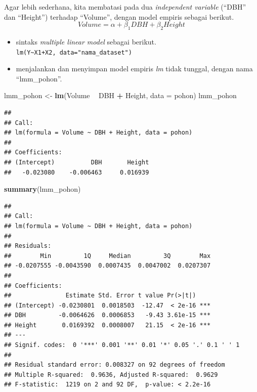 \documentclass[
  12pt,
  a4paper,
]{scrbook}
\newenvironment{Shaded}{\begin{snugshade}}{\end{snugshade}}
\newcommand{\DataTypeTok}[1]{\textcolor[rgb]{0.13,0.29,0.53}{#1}}
\newcommand{\KeywordTok}[1]{\textcolor[rgb]{0.13,0.29,0.53}{\textbf{#1}}}
\newcommand{\NormalTok}[1]{#1}
\newcommand{\OperatorTok}[1]{\textcolor[rgb]{0.81,0.36,0.00}{\textbf{#1}}}
\newcommand{\StringTok}[1]{\textcolor[rgb]{0.31,0.60,0.02}{#1}}
\begin{document}
Agar lebih sederhana, kita membatasi pada dua \emph{independent
variable} (``DBH'' dan ``Height'') terhadap ``Volume'', dengan model
empiris sebagai berikut.
\[Volume = \alpha + \beta_1DBH + \beta_2Height \]

\begin{itemize}
\item
  sintaks \emph{multiple linear model} sebagai berikut.\\
  \texttt{lm(Y\textasciitilde{}X1+X2,\ data="nama\_dataset")}
\item
  menjalankan dan menyimpan model empiris \emph{lm} tidak tunggal,
  dengan nama ``lmm\_pohon''.
\end{itemize}

\begin{Shaded}
\begin{Highlighting}[]
\NormalTok{lmm_pohon <-}\StringTok{ }\KeywordTok{lm}\NormalTok{(Volume }\OperatorTok{~}\StringTok{ }\NormalTok{DBH }\OperatorTok{+}\StringTok{ }\NormalTok{Height, }\DataTypeTok{data =}\NormalTok{ pohon)}
\NormalTok{lmm_pohon}
\end{Highlighting}
\end{Shaded}

\begin{verbatim}
## 
## Call:
## lm(formula = Volume ~ DBH + Height, data = pohon)
## 
## Coefficients:
## (Intercept)          DBH       Height  
##   -0.023080    -0.006463     0.016939
\end{verbatim}

\begin{Shaded}
\begin{Highlighting}[]
\KeywordTok{summary}\NormalTok{(lmm_pohon)}
\end{Highlighting}
\end{Shaded}

\begin{verbatim}
## 
## Call:
## lm(formula = Volume ~ DBH + Height, data = pohon)
## 
## Residuals:
##        Min         1Q     Median         3Q        Max 
## -0.0207555 -0.0043590  0.0007435  0.0047002  0.0207307 
## 
## Coefficients:
##               Estimate Std. Error t value Pr(>|t|)    
## (Intercept) -0.0230801  0.0018503  -12.47  < 2e-16 ***
## DBH         -0.0064626  0.0006853   -9.43 3.61e-15 ***
## Height       0.0169392  0.0008007   21.15  < 2e-16 ***
## ---
## Signif. codes:  0 '***' 0.001 '**' 0.01 '*' 0.05 '.' 0.1 ' ' 1
## 
## Residual standard error: 0.008327 on 92 degrees of freedom
## Multiple R-squared:  0.9636, Adjusted R-squared:  0.9629 
## F-statistic:  1219 on 2 and 92 DF,  p-value: < 2.2e-16
\end{verbatim}
\end{document}
